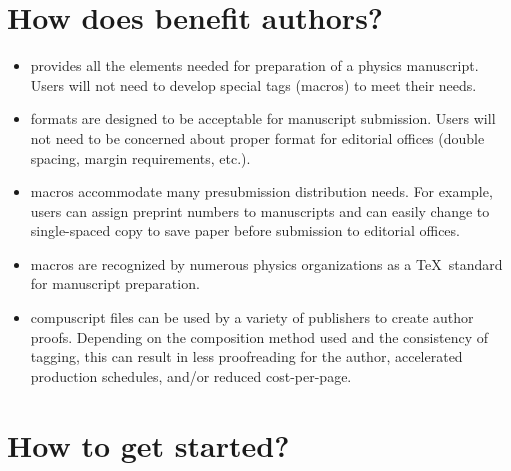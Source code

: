 \section{How does \REVTeX{} benefit authors?}
\begin{itemize}
\item \REVTeX{} provides all the elements needed for preparation of a
physics manuscript.   Users will not need to develop special tags (macros)
to meet their needs.

\item \REVTeX{} formats are designed to be acceptable for manuscript
submission.  Users will not need to be concerned about proper format for
editorial offices (double spacing, margin requirements, etc.).

\item \REVTeX{} macros accommodate many presubmission distribution needs.
For example, users can assign preprint numbers to manuscripts  and can
easily change to single-spaced copy to save paper before submission to
editorial offices.

\item \REVTeX{} macros are recognized by numerous physics organizations as
a \TeX\ standard for manuscript preparation.

\item \REVTeX{} compuscript files can be used by a variety of publishers to
create author proofs.  Depending on the composition method used and the
consistency of tagging, this can result in less proofreading for the
author, accelerated production schedules, and/or reduced cost-per-page.
\end{itemize}

\section{How to get started?}


